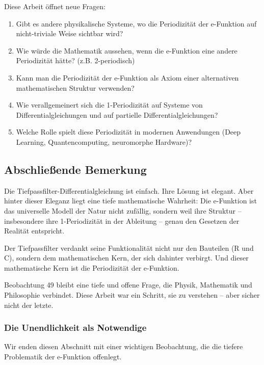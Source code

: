 \documentclass[a4paper, 12pt, twoside, openright]{report}
\theoremstyle{definition}
\theoremstyle{definition}
\begin{document}
Diese Arbeit öffnet neue Fragen:

\begin{enumerate}
	\item Gibt es andere physikalische Systeme, wo die Periodizität der e-Funktion auf nicht-triviale Weise sichtbar wird?
	
	\item Wie würde die Mathematik aussehen, wenn die e-Funktion eine andere Periodizität hätte? (z.B. 2-periodisch)
	
	\item Kann man die Periodizität der e-Funktion als Axiom einer alternativen mathematischen Struktur verwenden?
	
	\item Wie verallgemeinert sich die 1-Periodizität auf Systeme von Differentialgleichungen und auf partielle Differentialgleichungen?
	
	\item Welche Rolle spielt diese Periodizität in modernen Anwendungen (Deep Learning, Quantencomputing, neuromorphe Hardware)?
\end{enumerate}

\subsection{Abschließende Bemerkung}

Die Tiefpassfilter-Differentialgleichung ist einfach. Ihre Lösung ist elegant. Aber hinter dieser Eleganz liegt eine tiefe mathematische Wahrheit: Die e-Funktion ist das universelle Modell der Natur nicht zufällig, sondern weil ihre Struktur -- insbesondere ihre 1-Periodizität in der Ableitung -- genau den Gesetzen der Realität entspricht.

Der Tiefpassfilter verdankt seine Funktionalität nicht nur den Bauteilen (R und C), sondern dem mathematischen Kern, der sich dahinter verbirgt. Und dieser mathematische Kern ist die Periodizität der e-Funktion.

Beobachtung 49 bleibt eine tiefe und offene Frage, die Physik, Mathematik und Philosophie verbindet. Diese Arbeit war ein Schritt, sie zu verstehen -- aber sicher nicht der letzte.

\subsubsection{Die Unendlichkeit als Notwendige}

Wir enden diesen Abschnitt mit einer wichtigen Beobachtung, die die tiefere Problematik der e-Funktion offenlegt.
\end{document}
